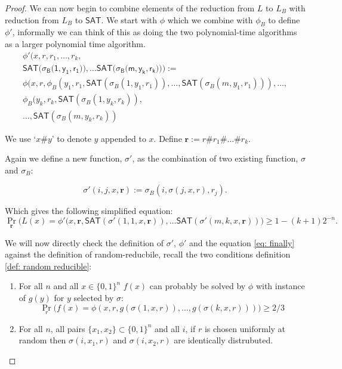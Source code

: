 \documentclass{article}
\begin{document}
\begin{proof}
We can now begin to combine elements of the reduction from $L$ to $L_B$ with reduction from $L_B$ to $\mathsf{SAT}$. We start with $\phi$ which we combine with $\phi_B$ to define $\phi'$, informally we can think of this as doing the two polynomial-time algorithms as a larger polynomial time algorithm.
\begin{multline*}
\phi'(x,r,r_1,\ldots,r_k,\\
\mathsf{SAT(\sigma_B(1,y_1,r_1})),\ldots \mathsf{SAT(\sigma_B(m,y_k,r_k}))):=
\\
\phi(x,r,\phi_{B}(y_1,r_1,\mathsf{SAT}(\sigma_{B}(1,y_1,r_1)),
\ldots, \mathsf{SAT}(\sigma_{B}(m, y_1, r_1))),\ldots,\\
\phi_{B}(y_k,r_k,\mathsf{SAT}(\sigma_{B}(1,y_k,r_k)),\\
\ldots, \mathsf{SAT}(\sigma_{B}(m,y_k,r_k))
\end{multline*}

We use `$x\#y$' to denote $y$ appended to $x$. Define $\mathbf{r}:=r\#r_1\#\ldots\#r_k$.

Again we define a new function, $\sigma'$, as the combination of two existing function, $\sigma$ and $\sigma_B$:

\[
\sigma'(i,j,x,\mathbf{r}):= \sigma_B(i,\sigma(j,x,r),r_j).
\]

Which gives the following simplified equation:
\begin{equation}\label{eq: finally}
\Pr_{\mathbf{r}}\big(
            L(x)=
\phi'(x,\mathbf{r}, \mathsf{SAT}(\sigma'(1,1,x,\mathbf{r})),\ldots \mathsf{SAT}(\sigma'(m,k,x,\mathbf{r}))
            \big)
            \geq 1-(k+1)2^{-n}.
\end{equation}

We will now directly check the definition of $\sigma'$, $\phi'$ and the equation \ref{eq: finally} against the definition of random-reducbile, recall the two conditions definition \ref{def: random reducible}:
\begin{enumerate}[label={(\arabic*)}]
        \item For all $n$ and all $x \in \{0,1\}^n$ $f(x)$ can probably be solved by $\phi$ with instance of $g(y)$ for $y$ selected by $\sigma$:
            \[
            \Pr_{r}\big(
            f(x)=\phi(x,r,g(\sigma(1,x,r)),\ldots, g(\sigma(k, x, r)))
            \big)\geq2/3
            \]
        \item For all $n$, all pairs $\{x_1,x_2\}\subset \{0,1\}^n$ and all $i$, if $r$ is chosen uniformly at random then $\sigma(i,x_1,r)$ and $\sigma(i,x_2,r)$ are identically distrubuted.
    \end{enumerate}


\end{proof}
\end{document}
